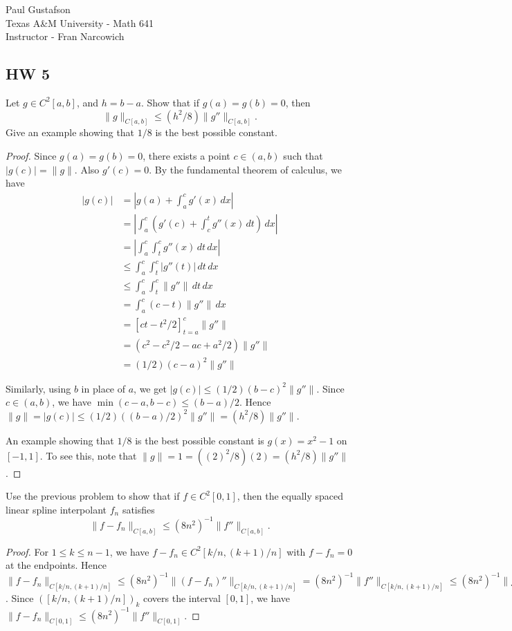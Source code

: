 \documentclass{article}
\begin{document}
\noindent Paul Gustafson\\
\noindent Texas A\&M University - Math 641\\ 
\noindent Instructor - Fran Narcowich

\subsection*{HW 5}
 Let $g \in C^2[a,b]$, and $h = b-a$. Show that if $g(a) = g(b) = 0$, then 
$$\|g\|_{C[a,b]} \le (h^2/8) \|g''\|_{C[a,b]}.$$
Give an example showing that $1/8$ is the best possible constant.
\begin{proof}
Since $g(a) = g(b) = 0$, there exists a point $c \in (a,b)$ such that $|g(c)| = \|g\|$.  Also $g'(c) = 0$.
By the fundamental theorem of calculus, we have
\begin{align*}
|g(c)| & = \left| g(a) + \int_a^c g'(x) \, dx \right|
\\ & = \left| \int_a^c \left(g'(c) + \int_c^t g''(x) \,dt \right)\,dx \right|
\\ & = \left| \int_a^c  \int_t^c g''(x) \,dt \,dx \right|
\\ & \le \int_a^c \int_t^c |g''(t)| \,dt\,dx
\\ & \le \int_a^c \int_t^c \|g''\| \,dt\,dx
\\ & = \int_a^c (c - t) \|g''\| \, dx
\\ & = \left[ ct  - t^2/2 \right]_{t=a}^c \|g''\| 
\\ & = (c^2 - c^2/2 - ac + a^2/2) \|g''\| 
\\ & = (1/2) (c - a)^2 \|g''\|
\end{align*}

Similarly, using $b$ in place of $a$, we get $|g(c)| \le (1/2) (b - c)^2 \|g''\|$.  Since $c \in (a,b)$, we have $\min(c-a, b-c) \le (b-a)/2$.
Hence $\|g\| = |g(c)| \le (1/2) ((b-a)/2)^2 \|g''\| = (h^2/8) \|g''\|$.

An example showing that $1/8$ is the best possible constant is $g(x) = x^2 - 1$ on $[-1, 1]$. To see this, note that $\|g\| = 1 = ((2)^2/8) (2) = (h^2/8) \|g''\|$.
\end{proof}

 Use the previous problem to show that if $f \in C^2[0,1]$, then the equally spaced linear spline interpolant $f_n$ satisfies
$$\|f - f_n \|_{C[a,b]} \le (8n^2)^{-1} \|f''\|_{C[a,b]}.$$
\begin{proof}
For $1 \le k \le n-1$, we have $f -f_n \in C^2[k/n, (k+1)/n]$ with $f -f_n = 0$ at the endpoints.  Hence $\|f - f_n\|_{C[k/n, (k+1)/n]} \le (8n^2)^{-1} \|(f - f_n)''\|_{C[k/n, (k+1)/n]}  = (8n^2)^{-1} \|f''\|_{C[k/n, (k+1)/n]} \le (8n^2)^{-1} \|f''\|_{C[0,1]}$.  Since $([k/n, (k+1)/n])_k$ covers the interval $[0,1]$, we have $\|f - f_n \|_{C[0,1]} \le (8n^2)^{-1} \|f''\|_{C[0,1]}$.
\end{proof}
\end{document}
